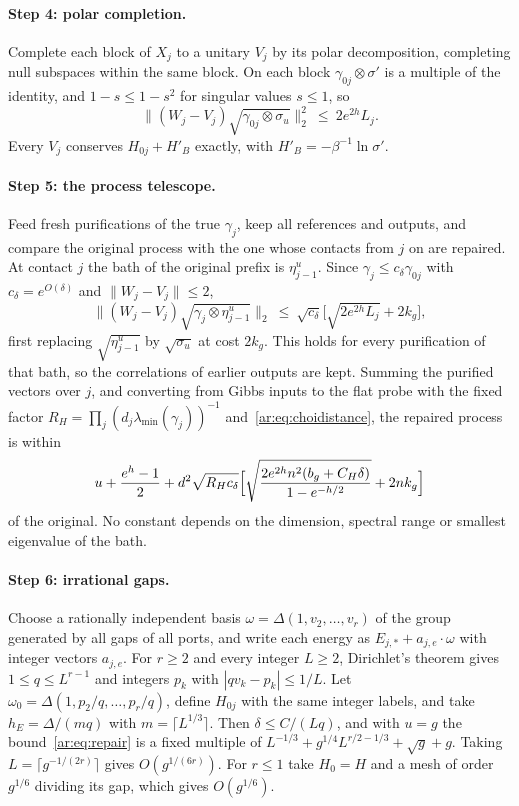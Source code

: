 \paragraph{Step 4: polar completion.} Complete each block of $X_j$ to a unitary $V_j$ by its polar decomposition, completing null subspaces within the same block. On each block $\gamma_{0j}\otimes\sigma'$ is a multiple of the identity, and $1-s\le1-s^2$ for singular values $s\le1$, so
\[
\|(W_j-V_j)\sqrt{\gamma_{0j}\otimes\sigma_u}\|_2^2\ \le\ 2e^{2h}L_j.
\]
Every $V_j$ conserves $H_{0j}+H'_B$ exactly, with $H'_B=-\beta^{-1}\ln\sigma'$.

\paragraph{Step 5: the process telescope.} Feed fresh purifications of the true $\gamma_j$, keep all references and outputs, and compare the original process with the one whose contacts from $j$ on are repaired. At contact $j$ the bath of the original prefix is $\eta^u_{j-1}$. Since $\gamma_j\le c_\delta\gamma_{0j}$ with $c_\delta=e^{O(\delta)}$ and $\|W_j-V_j\|\le2$,
\[
\|(W_j-V_j)\sqrt{\gamma_j\otimes\eta^u_{j-1}}\|_2\ \le\ \sqrt{c_\delta}\bigl[\sqrt{2e^{2h}L_j}+2k_g\bigr],
\]
first replacing $\sqrt{\eta^u_{j-1}}$ by $\sqrt{\sigma_u}$ at cost $2k_g$. This holds for every purification of that bath, so the correlations of earlier outputs are kept. Summing the purified vectors over $j$, and converting from Gibbs inputs to the flat probe with the fixed factor $R_H=\prod_j(d_j\lambda_{\min}(\gamma_j))^{-1}$ and~\eqref{ar:eq:choidistance}, the repaired process is within
\begin{equation}\label{ar:eq:repair}
u+\frac{e^h-1}2+d^2\sqrt{R_Hc_\delta}\Bigl[\sqrt{\frac{2e^{2h}n^2(b_g+C_H\delta)}{1-e^{-h/2}}}+2nk_g\Bigr]
\end{equation}
of the original. No constant depends on the dimension, spectral range or smallest eigenvalue of the bath.

\paragraph{Step 6: irrational gaps.} Choose a rationally independent basis $\omega=\Delta(1,v_2,\dots,v_r)$ of the group generated by all gaps of all ports, and write each energy as $E_{j,*}+a_{j,e}\cdot\omega$ with integer vectors $a_{j,e}$. For $r\ge2$ and every integer $L\ge2$, Dirichlet's theorem gives $1\le q\le L^{r-1}$ and integers $p_k$ with $|qv_k-p_k|\le1/L$. Let $\omega_0=\Delta(1,p_2/q,\dots,p_r/q)$, define $H_{0j}$ with the same integer labels, and take $h_E=\Delta/(mq)$ with $m=\lceil L^{1/3}\rceil$. Then $\delta\le C/(Lq)$, and with $u=g$ the bound~\eqref{ar:eq:repair} is a fixed multiple of $L^{-1/3}+g^{1/4}L^{r/2-1/3}+\sqrt g+g$. Taking $L=\lceil g^{-1/(2r)}\rceil$ gives $O(g^{1/(6r)})$. For $r\le1$ take $H_0=H$ and a mesh of order $g^{1/6}$ dividing its gap, which gives $O(g^{1/6})$.

